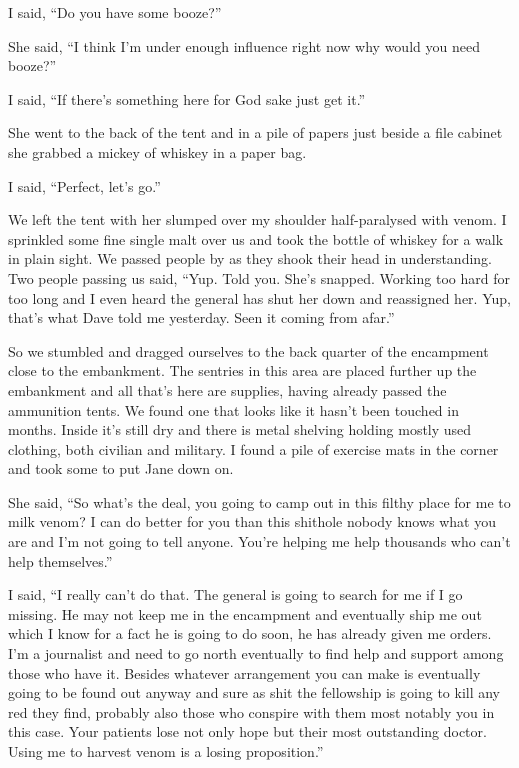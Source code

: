 I said, ``Do you have some booze?''

She said, ``I think I'm under enough influence right now why would you need booze?''

I said, ``If there's something here for God sake just get it.''

She went to the back of the tent and in a pile of papers just beside a file cabinet she grabbed a mickey of whiskey in a paper bag.

I said, ``Perfect, let's go.''

We left the tent with her slumped over my shoulder half-paralysed with venom. I sprinkled some fine single malt over us and took the bottle of whiskey for a walk in plain sight. We passed people by as they shook their head in understanding. Two people passing us said, ``Yup. Told you. She's snapped. Working too hard for too long and I even heard the general has shut her down and reassigned her. Yup, that's what Dave told me yesterday. Seen it coming from afar.''

So we stumbled and dragged ourselves to the back quarter of the encampment close to the embankment. The sentries in this area are placed further up the embankment and all that's here are supplies, having already passed the ammunition tents. We found one that looks like it hasn't been touched in months. Inside it's still dry and there is metal shelving holding mostly used clothing, both civilian and military. I found a pile of exercise mats in the corner and took some to put Jane down on.

She said, ``So what's the deal, you going to camp out in this filthy place for me to milk venom? I can do better for you than this shithole nobody knows what you are and I'm not going to tell anyone. You're helping me help thousands who can't help themselves.''

I said, ``I really can't do that. The general is going to search for me if I go missing. He may not keep me in the encampment and eventually ship me out which I know for a fact he is going to do soon, he has already given me orders. I'm a journalist and need to go north eventually to find help and support among those who have it. Besides whatever arrangement you can make is eventually going to be found out anyway and sure as shit the fellowship is going to kill any red they find, probably also those who conspire with them most notably you in this case. Your patients lose not only hope but their most outstanding doctor. Using me to harvest venom is a losing proposition.''

